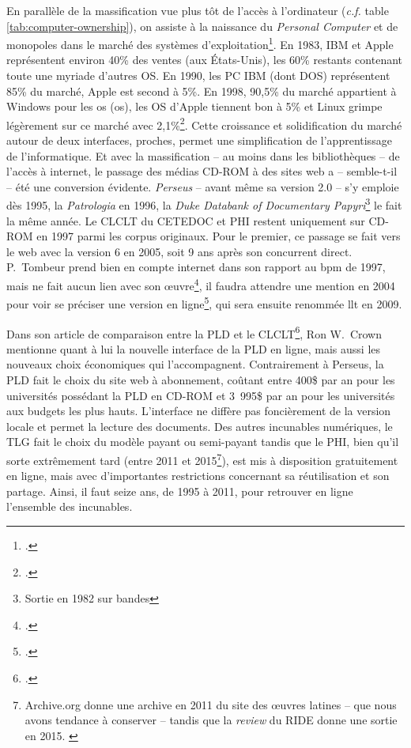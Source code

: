 En parallèle de la massification vue plus tôt de l'accès à l'ordinateur (\textit{c.f.} table \ref{tab:computer-ownership}), on assiste à la naissance du \textit{Personal Computer} et de monopoles dans le marché des systèmes d'exploitation\footcite{schlender_whos_1990}. En 1983, IBM et Apple représentent environ 40\% des ventes (aux États-Unis), les 60\% restants contenant toute une myriade d'autres OS. En 1990, les PC IBM (dont DOS) représentent 85\% du marché, Apple est second à 5\%. En 1998, 90,5\% du marché appartient à Windows pour les \acrfull{os} (\acrshort{os}), les OS d'Apple tiennent bon à 5\% et Linux grimpe légèrement sur ce marché avec 2,1\%\footcite{miles_windows_1999, reimer_total_2005}. Cette croissance et solidification du marché autour de deux interfaces, proches, permet une simplification de l'apprentissage de l'informatique. Et avec la massification -- au moins dans les bibliothèques -- de l'accès à internet, le passage des médias CD-ROM à des sites web a -- semble-t-il -- été une conversion évidente. \textit{Perseus} -- avant même sa version 2.0 -- s'y emploie dès 1995, la \textit{Patrologia} en 1996, la \textit{Duke Databank of Documentary Papyri}\footnote{Sortie en 1982 sur bandes} le fait la même année. Le CLCLT du CETEDOC  et PHI restent uniquement sur CD-ROM en 1997 parmi les corpus originaux. Pour le premier, ce passage se fait vers le web avec la version 6 en 2005, soit 9 ans après son concurrent direct. P.~Tombeur prend bien en compte internet dans son rapport au \acrfull{bpm} de 1997, mais ne fait aucun lien avec son œuvre\footcite{tombeur_informatique_1997}, il faudra attendre une mention en 2004 pour voir se préciser une version en ligne\footcite{tombeur_augustin_2004}, qui sera ensuite renommée \acrfull{llt} en 2009.

Dans son article de comparaison entre la PLD et le CLCLT\footcite{crown_comparing_2000}, Ron W.~Crown mentionne quant à lui la nouvelle interface de la PLD en ligne, mais aussi les nouveaux choix économiques qui l'accompagnent. Contrairement à Perseus, la PLD fait le choix du site web à abonnement, coûtant entre 400\$ par an pour les universités possédant la PLD en CD-ROM et 3~995\$ par an pour les universités aux budgets les plus hauts. L'interface ne diffère pas foncièrement de la version locale et permet la lecture des documents. Des autres incunables numériques, le TLG fait le choix du modèle payant ou semi-payant tandis que le PHI, bien qu'il sorte extrêmement tard (entre 2011 et 2015\footnote{Archive.org donne une archive en 2011 du site des œuvres latines -- que nous avons tendance à conserver -- tandis que la \textit{review} du RIDE donne une sortie en 2015. \cite{daniel_kozak_classical_2018}}), est mis à disposition gratuitement en ligne, mais avec d'importantes restrictions concernant sa réutilisation et son partage. Ainsi, il faut seize ans, de 1995 à 2011, pour retrouver en ligne l'ensemble des incunables. 

